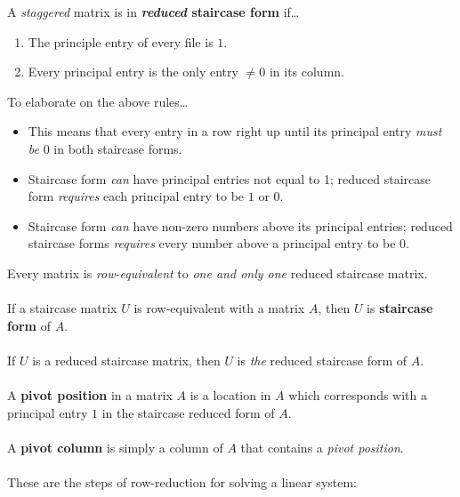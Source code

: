 \documentclass[12pt]{article}
\begin{document}
A \emph{staggered} matrix is in \textbf{\emph{reduced} staircase form} if\dots

\begin{enumerate}
    \item The principle entry of every file is $1$.
    \item Every principal entry is the only entry $\neq 0$ in its column.
\end{enumerate}

To elaborate on the above rules\dots

\begin{itemize}
    \item This means that every entry in a row right up until its principal entry \emph{must be} $0$ in both staircase forms.
    \item Staircase form \emph{can} have principal entries not equal to 1; reduced staircase form \emph{requires} each principal entry to be $1$ or $0$.
    \item Staircase form \emph{can} have non-zero numbers above its principal entries; reduced staircase forms \emph{requires} every number above a principal entry to be $0$.
\end{itemize}

Every matrix is \emph{row-equivalent} to \emph{one and only one} reduced staircase matrix. \\ \\

If a staircase matrix $U$ is row-equivalent with a matrix $A$, then $U$ is \textbf{staircase form} of $A$. \\ \\

If $U$ is a reduced staircase matrix, then $U$ is \emph{the} reduced staircase form of $A$. \\ \\ 

A \textbf{pivot position} in a matrix $A$ is a location in $A$ which corresponds with a principal entry $1$ in
the staircase reduced form of $A$. \\ \\

A \textbf{pivot column} is simply a column of $A$ that contains a \emph{pivot position}. \\ \\

These are the steps of row-reduction for solving a linear system:
\end{document}
